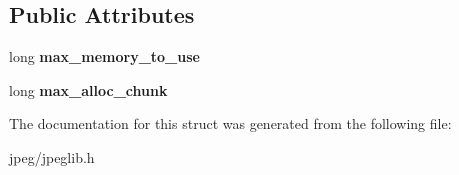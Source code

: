 \subsection*{Public Attributes}
\begin{DoxyCompactItemize}
\item 
long {\bfseries max\+\_\+memory\+\_\+to\+\_\+use}\hypertarget{structjpeg__memory__mgr_aa7ef7c0d7ffbfcbee837ae9cb8b12c7e}{}\label{structjpeg__memory__mgr_aa7ef7c0d7ffbfcbee837ae9cb8b12c7e}

\item 
long {\bfseries max\+\_\+alloc\+\_\+chunk}\hypertarget{structjpeg__memory__mgr_a0301712c8796bb5555093d72b37c5a58}{}\label{structjpeg__memory__mgr_a0301712c8796bb5555093d72b37c5a58}

\end{DoxyCompactItemize}


The documentation for this struct was generated from the following file\+:\begin{DoxyCompactItemize}
\item 
jpeg/jpeglib.\+h\end{DoxyCompactItemize}
